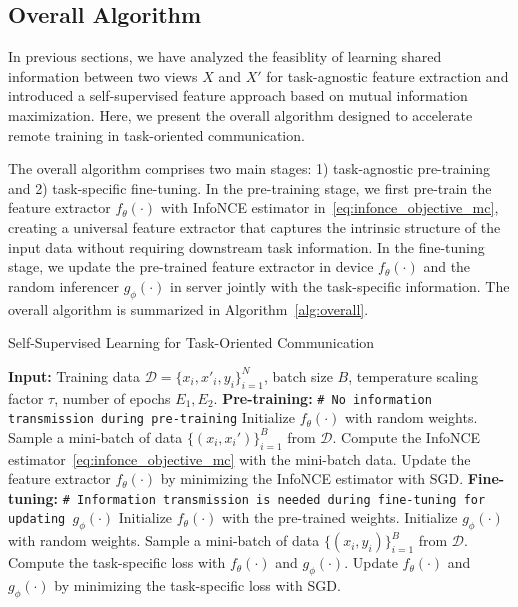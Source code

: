 \subsection{Overall Algorithm}
In previous sections, we have analyzed the feasiblity of learning shared information between two views $X$ and $X'$ for task-agnostic feature extraction and introduced a self-supervised feature approach based on mutual information maximization. Here, we present the overall algorithm designed to accelerate remote training in task-oriented communication. 

The overall algorithm comprises two main stages: 1) task-agnostic pre-training and 2) task-specific fine-tuning. In the pre-training stage, we first pre-train the feature extractor $f_\theta(\cdot)$ with InfoNCE estimator in~\eqref{eq:infonce_objective_mc}, creating a universal feature extractor that captures the intrinsic structure of the input data without requiring downstream task information. In the fine-tuning stage, we update the pre-trained feature extractor in device $f_{\theta}(\cdot)$ and the random inferencer $g_{\phi}(\cdot)$ in server jointly with the task-specific information. The overall algorithm is summarized in Algorithm~\ref{alg:overall}. 

\vspace{5pt}
\begin{algorithm}
    \caption{Self-Supervised Learning for Task-Oriented Communication}
    \label{alg:overall}
    \begin{algorithmic}[1]
        \State \textbf{Input:} Training data $\mathcal{D}=\{x_i,x'_i, y_i\}_{i=1}^{N}$, batch size $B$, temperature scaling factor $\tau$, number of epochs $E_1,E_2$.
        \State \textbf{Pre-training:}
        \State \texttt{\# No information transmission during pre-training}
        \State Initialize $f_\theta(\cdot)$ with random weights.
        \State Sample a mini-batch of data $\{(x_i,x_i')\}_{i=1}^{B}$ from $\mathcal{D}$.
        \State Compute the InfoNCE estimator~\eqref{eq:infonce_objective_mc} with the mini-batch data.
        \State Update the feature extractor $f_\theta(\cdot)$ by minimizing the InfoNCE estimator with SGD.
        \EndFor
        \State \textbf{Fine-tuning:}
        \State \texttt{\# Information transmission is needed during fine-tuning for updating $g_\phi(\cdot)$}
        \State Initialize $f_\theta(\cdot)$ with the pre-trained weights.
        \State Initialize $g_\phi(\cdot)$ with random weights.
        \State Sample a mini-batch of data $\{(x_i,y_i)\}_{i=1}^{B}$ from $\mathcal{D}$.
        \State Compute the task-specific loss with $f_\theta(\cdot)$ and $g_\phi(\cdot)$.
        \State Update $f_\theta(\cdot)$ and $g_\phi(\cdot)$ by minimizing the task-specific loss with SGD.
        \EndFor
    \end{algorithmic}
\end{algorithm}



